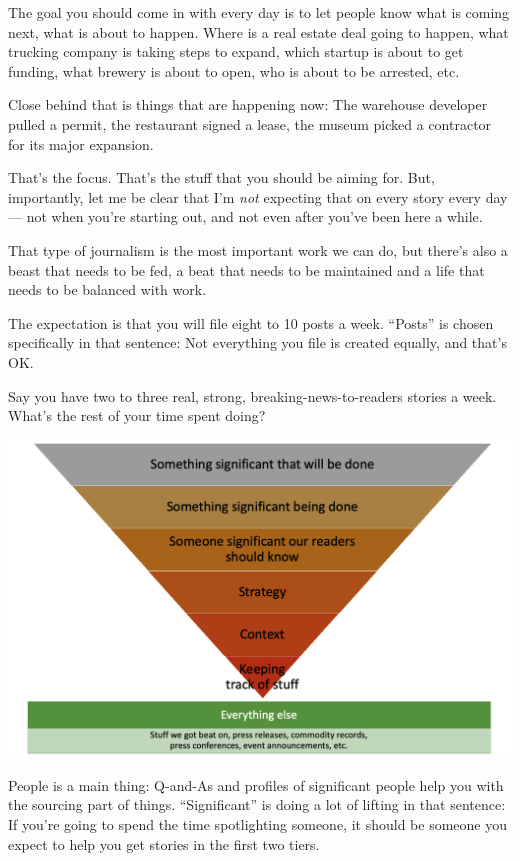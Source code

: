 \documentclass[
  11pt,
  american,
  letterpaperpaper,
  extrafontsizes,onecolumn,openright
  ]{memoir}
\begin{document}
The goal you should come in with every day is to let people know what is coming next, what is about to happen. Where is a real estate deal going to happen, what trucking company is taking steps to expand, which startup is about to get funding, what brewery is about to open, who is about to be arrested, etc.

Close behind that is things that are happening now: The warehouse developer pulled a permit, the restaurant signed a lease, the museum picked a contractor for its major expansion.

That's the focus. That's the stuff that you should be aiming for. But, importantly, let me be clear that I'm \emph{not} expecting that on every story every day --- not when you're starting out, and not even after you've been here a while.

That type of journalism is the most important work we can do, but there's also a beast that needs to be fed, a beat that needs to be maintained and a life that needs to be balanced with work.

The expectation is that you will file eight to 10 posts a week. \enquote{Posts} is chosen specifically in that sentence: Not everything you file is created equally, and that's OK.

Say you have two to three real, strong, breaking-news-to-readers stories a week. What's the rest of your time spent doing?

\scriptsize

\begin{center}\includegraphics[width=0.8\linewidth]{images/story_hierarchy} \end{center}

\normalsize
People is a main thing: Q-and-As and profiles of significant people help you with the sourcing part of things. \enquote{Significant} is doing a lot of lifting in that sentence: If you're going to spend the time spotlighting someone, it should be someone you expect to help you get stories in the first two tiers.
\end{document}
